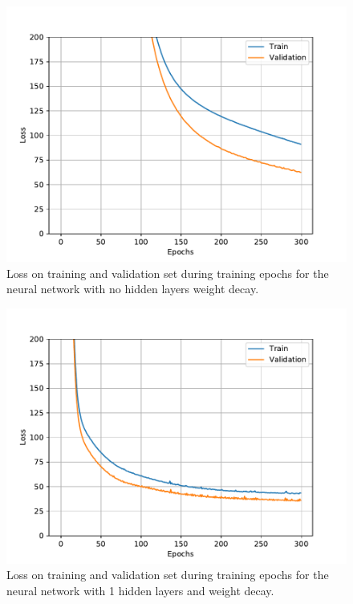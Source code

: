 \begin{figure}[h!]
    \centering
    \includegraphics[width=\textwidth]{pics/figure_Boston_NN_nohidden_wd_loss.pdf}
    \caption{Loss on training and validation set during training epochs for the neural network with no hidden layers weight decay.}
    \label{fig:Boston_NN_nohidden_wd_loss}
\end{figure}

\begin{figure}
    \centering
    \includegraphics[width=\textwidth]{pics/figure_Boston_NN_1hidden_wd_loss.pdf}
    \caption{Loss on training and validation set during training epochs for the neural network with 1 hidden layers and weight decay. }
    \label{fig:Boston_NN_1hidden_wd_loss}
\end{figure}


